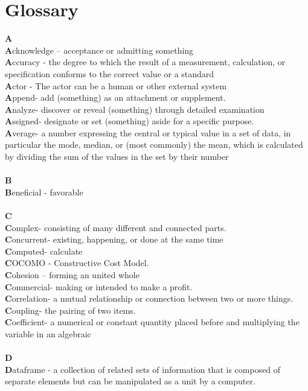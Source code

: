 \documentclass[a4paper, 11pt]{article}
\begin{document}
\section{Glossary}
\textbf{A} \\ 
\textbf{A}cknowledge – acceptance or admitting something \\
\textbf{A}ccuracy - the degree to which the result of a measurement, calculation, or specification conforms to the correct value or a standard \\
\textbf{A}ctor - The actor can be a human or other external system \\
\textbf{A}ppend- add (something) as an attachment or supplement. \\
\textbf{A}nalyze- discover or reveal (something) through detailed examination \\
\textbf{A}ssigned- designate or set (something) aside for a specific purpose. \\
\textbf{A}verage- a number expressing the central or typical value in a set of data, in particular the mode, median, or (most commonly) the mean, which is calculated by dividing the sum of the values in the set by their number\\ \\
\textbf{B} \\
\textbf{B}eneficial - favorable \\ \\
\textbf{C}\\
\textbf{C}omplex- consisting of many different and connected parts.\\
\textbf{C}oncurrent- existing, happening, or done at the same time\\
\textbf{C}omputed- calculate\\
\textbf{C}OCOMO - Constructive Cost Model.\\
\textbf{C}ohesion – forming an united whole\\
\textbf{C}ommercial- making or intended to make a profit.\\
\textbf{C}orrelation- a mutual relationship or connection between two or more things.\\
\textbf{C}oupling- the pairing of two items.\\
\textbf{C}oefficient- a numerical or constant quantity placed before and multiplying the variable in an algebraic\\ \\
\textbf{D}\\
\textbf{D}ataframe - a collection of related sets of information that is composed of separate elements but can be manipulated as a unit by a computer.\\
\end{document}
